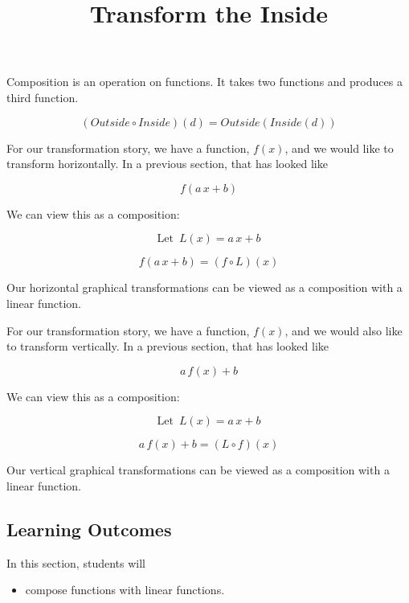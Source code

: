 \documentclass{ximera}
\title{Transform the Inside}
\begin{document}
\begin{abstract}
\end{abstract}
\maketitle






Composition is an operation on functions.  It takes two functions and produces a third function.


\[  (Outside \circ Inside)(d) = Outside(Inside(d))    \]


For our transformation story, we have a function, $f(x)$, and we would like to transform horizontally.  In a previous section, that has looked like


\[   f(a \, x + b)  \]


We can view this as a composition:


\[  \text{Let } \, L(x) = a \, x + b   \]


\[   f(a \, x + b)  = (f \circ L)(x)\]



Our horizontal graphical transformations can be viewed as a composition with a linear function.





For our transformation story, we have a function, $f(x)$, and we would also like to transform vertically.  In a previous section, that has looked like


\[   a \, f(x) + b  \]


We can view this as a composition:


\[  \text{Let } \, L(x) = a \, x + b   \]


\[   a \, f(x) + b  = (L \circ f)(x)\]



Our vertical graphical transformations can be viewed as a composition with a linear function.









\subsection*{Learning Outcomes}


\begin{sectionOutcomes}
In this section, students will 

\begin{itemize}
\item compose functions with linear functions.
\end{itemize}
\end{sectionOutcomes}
\end{document}
